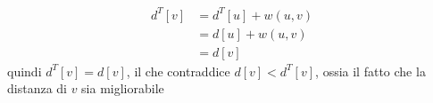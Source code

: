 \begin{itemize}
\begin{itemize}
		            \begin{align*}
			            d^{T}\left[v\right] & = d^{T}\left[u\right] + w\left(u,v\right) \\
			                                & = d\left[u\right] + w\left(u,v\right)     \\
			                                & = d\left[v\right]
		            \end{align*}
		            quindi $ d^{T}\left[v\right] = d\left[v\right] $, il che contraddice $ d\left[v\right] < d^{T}\left[v\right] $, ossia il fatto che la distanza di $ v $ sia migliorabile
	      \end{itemize}
\end{itemize}
